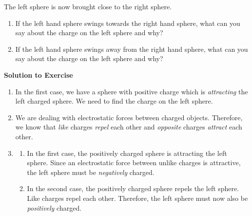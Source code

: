 {\begin{mdframed}[linewidth=4, leftmargin=40, rightmargin=40]
\begin{exercise}
\begin{figure}[H]
\begin{center}
      \vspace{2pt}
    \vspace{.1in}
    
    \end{center}

 \end{figure}   

    \addtocounter{footnote}{-0}
    
      \par 
      \label{m38780*id201031}The left sphere is now brought close to the right sphere.\par 
      \label{m38780*id201034}\begin{enumerate}[noitemsep, label=\textbf{\arabic*}. ] 
            \leftskip=20pt\rightskip=\leftskip\label{m38780*uid3}\item If the left hand sphere swings towards the right hand sphere, what can you say about the charge on the left sphere and why?
\label{m38780*uid4}\item If the left hand sphere swings away from the right hand sphere, what can you say about the charge on the left sphere and why?
\end{enumerate}
        
      
      \vspace{5pt}
      \label{m38780*solfhsst!!!underscore!!!id210}\noindent\textbf{Solution to Exercise } \label{m38780*listfhsst!!!underscore!!!id210}\begin{enumerate}[noitemsep, label=\textbf{Step} \textbf{\arabic*}. ] 
            \leftskip=20pt\rightskip=\leftskip\item  
      \label{m38780*id201084}In the first case, we have a sphere with positive charge which is \textsl{attracting} the left charged sphere. We need to find the charge on the left sphere.\par 
      \item  
      \label{m38780*id201097}We are dealing with electrostatic forces between charged objects. Therefore, we know that \textsl{like} charges \textsl{repel} each other and \textsl{opposite} charges \textsl{attract} each other.\par 
      \item  
      \label{m38780*id201126}\begin{enumerate}[noitemsep, label=\textbf{\alph*}. ] 
            \leftskip=20pt\rightskip=\leftskip\label{m38780*uid5}\item In the first case, the positively charged sphere is attracting the left sphere. Since an electrostatic force between unlike charges is attractive, the left sphere must be \textsl{negatively} charged.
\label{m38780*uid6}\item In the second case, the positively charged sphere repels the left sphere. Like charges repel each other. Therefore, the left sphere must now also be \textsl{positively} charged.
\end{enumerate}
        

\end{enumerate}
\end{exercise}
\end{mdframed}}
